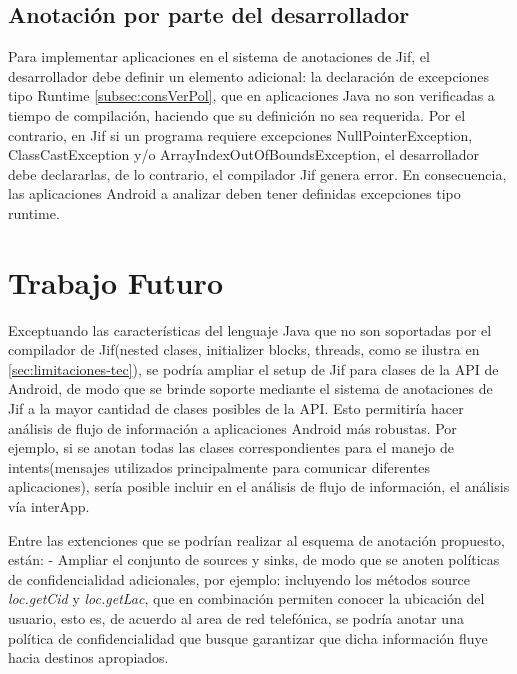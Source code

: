 \subsection{Anotación por parte del desarrollador}
\label{subsec:cambios}
Para implementar aplicaciones en el sistema de anotaciones de Jif, el
desarrollador debe definir un elemento adicional: la declaración de
excepciones tipo Runtime \ref{subsec:consVerPol}, que en aplicaciones Java no
son verificadas a tiempo de compilación, haciendo que su definición no sea requerida. 
Por el contrario, en Jif si un programa requiere excepciones
NullPointerException, ClassCastException y/o ArrayIndexOutOfBoundsException, el
desarrollador debe declararlas, de lo contrario, el compilador Jif genera
error.
En consecuencia, las aplicaciones Android a analizar deben tener definidas
excepciones tipo runtime.

\section{Trabajo Futuro}

Exceptuando las características del lenguaje Java que no son soportadas por el
compilador de Jif(nested clases, initializer blocks, threads, como se ilustra en
 \ref{sec:limitaciones-tec}), se podría ampliar el setup de Jif para clases de
 la API de Android, de modo que se brinde soporte mediante el sistema de anotaciones de
Jif a la mayor cantidad de clases posibles de la API.
Esto permitiría hacer análisis de flujo de información a aplicaciones
Android más robustas. Por ejemplo, si se anotan todas las clases
correspondientes para el manejo de intents(mensajes utilizados principalmente
para comunicar diferentes aplicaciones), sería posible incluir en el análisis de
flujo de información, el análisis vía interApp.\newline


Entre las extenciones que se podrían realizar al esquema de anotación propuesto,
están:\newline 
- Ampliar el conjunto de sources y sinks, de modo que se anoten políticas de
confidencialidad adicionales, por ejemplo: incluyendo los métodos source
\emph{loc.getCid} y \emph{loc.getLac}, que en combinación permiten conocer la
ubicación del usuario, esto es, de acuerdo al area de red telefónica, se
podría anotar una política de confidencialidad que busque garantizar que dicha
información fluye hacia destinos apropiados.


